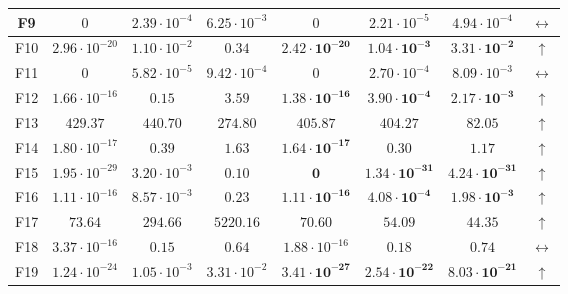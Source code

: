 \begin{table}[!t]
\begin{scriptsize}
\begin{tabular}{c || c c c | c c c c}
F9  & $0$                    & $2.39 \cdot 10^{-4}$  & $6.25 \cdot 10^{-3}$  & $0$                            & $2.21 \cdot 10^{-5}$           & $4.94 \cdot 10^{-4}$           & $\leftrightarrow$   \\ \hline
F10 & $2.96 \cdot 10^{-20}$  & $1.10 \cdot 10^{-2}$  & $0.34$                & $\mathbf{2.42 \cdot 10^{-20}}$ & $\mathbf{1.04 \cdot 10^{-3}}$  & $\mathbf{3.31 \cdot 10^{-2}}$  & $\uparrow$          \\ \hline
F11 & $0$                    & $5.82 \cdot 10^{-5}$  & $9.42 \cdot 10^{-4}$  & $0$                            & $2.70 \cdot 10^{-4}$           & $8.09 \cdot 10^{-3}$           & $\leftrightarrow$   \\ \hline
F12 & $1.66 \cdot 10^{-16}$  & $0.15$                & $3.59$                & $\mathbf{1.38 \cdot 10^{-16}}$ & $\mathbf{3.90 \cdot 10^{-4}}$  & $\mathbf{2.17 \cdot 10^{-3}}$  & $\uparrow$          \\ \hline
F13 & $429.37$               & $440.70$              & $274.80$              & $\mathbf{405.87}$              & $\mathbf{404.27}$              & $\mathbf{82.05}$               & $\uparrow$          \\ \hline
F14 & $1.80 \cdot 10^{-17}$  & $0.39$                & $1.63$                & $\mathbf{1.64 \cdot 10^{-17}}$ & $\mathbf{0.30}$                & $\mathbf{1.17}$                & $\uparrow$          \\ \hline
F15 & $1.95 \cdot 10^{-29}$  & $3.20 \cdot 10^{-3}$  & $0.10$                & $\mathbf{0}$                   & $\mathbf{1.34 \cdot 10^{-31}}$ & $\mathbf{4.24 \cdot 10^{-31}}$ & $\uparrow$          \\ \hline
F16 & $1.11 \cdot 10^{-16}$  & $8.57 \cdot 10^{-3}$  & $0.23$                & $\mathbf{1.11 \cdot 10^{-16}}$ & $\mathbf{4.08 \cdot 10^{-4}}$  & $\mathbf{1.98 \cdot 10^{-3}}$  & $\uparrow$          \\ \hline
F17 & $73.64$                & $294.66$              & $5220.16$             & $\mathbf{70.60}$               & $\mathbf{54.09}$               & $\mathbf{44.35}$               & $\uparrow$          \\ \hline
F18 & $3.37 \cdot 10^{-16}$  & $0.15$                & $0.64$                & $1.88 \cdot 10^{-16}$          & $0.18$                         & $0.74$                         & $\leftrightarrow$   \\ \hline
F19 & $1.24 \cdot 10^{-24}$  & $1.05 \cdot 10^{-3}$  & $3.31 \cdot 10^{-2}$  & $\mathbf{3.41 \cdot 10^{-27}}$ & $\mathbf{2.54 \cdot 10^{-22}}$ & $\mathbf{8.03 \cdot 10^{-21}}$ & $\uparrow$          \\ \hline
\end{tabular}
\end{scriptsize}
\end{table}


